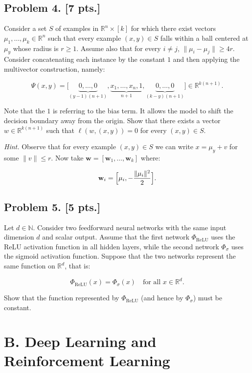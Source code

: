 \documentclass[11pt,a4paper]{article}
\begin{document}
\subsection{Problem 4. [7 pts.]}
Consider a set $S$ of examples in $\mathbb{R}^{n} \times [k]$ for which there exist vectors $\mu_1, \dots, \mu_k \in \mathbb{R}^{n}$ such that every example $(x, y) \in S$ falls within a ball centered at $\mu_y$ whose radius is $r \ge 1$. Assume also that for every $i \neq j$, $\|\mu_i - \mu_j\| \ge 4r$.
Consider concatenating each instance by the constant $1$ and then applying the multivector construction, namely:

\[
\Psi(x, y) = \bigl[ \underbrace{0, \dots, 0}_{(y-1)(n+1)}, \underbrace{x_1, \dots, x_n, 1}_{n+1}, \underbrace{0, \dots, 0}_{(k-y)(n+1)} \bigr] \in \mathbb{R}^{k(n+1)}.
\]

Note that the $1$ is referring to the bias term. It allows the model to shift the decision boundary away from the origin. Show that there exists a vector $w \in \mathbb{R}^{k(n+1)}$ such that $\ell(w, (x, y)) = 0$ for every $(x, y) \in S$.

\textit{Hint.} Observe that for every example $(x, y) \in S$ we can write $x = \mu_y + v$ for some $\|v\| \le r$. Now take $\mathbf{w} = [\mathbf{w}_1, \dots, \mathbf{w}_k]$ where:

\[
\mathbf{w}_i = \Bigl[\mu_i, -\frac{\|\mu_i\|^{2}}{2}\Bigr].
\]

\subsection{Problem 5. [5 pts.]}
Let $d \in \mathbb{N}$. Consider two feedforward neural networks with the same input dimension $d$ and scalar output. Assume that the first network $\Phi_{\mathrm{ReLU}}$ uses the ReLU activation function in all hidden layers, while the second network $\Phi_{\sigma}$ uses the sigmoid activation function. Suppose that the two networks represent the same function on $\mathbb{R}^{d}$, that is:

\[
\Phi_{\mathrm{ReLU}}(x) = \Phi_{\sigma}(x) \quad \text{for all } x \in \mathbb{R}^{d}.
\]

Show that the function represented by $\Phi_{\mathrm{ReLU}}$ (and hence by $\Phi_{\sigma}$) must be constant.

\section{B. Deep Learning and Reinforcement Learning}
\end{document}
